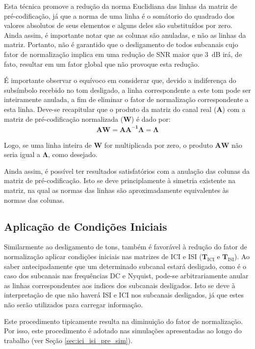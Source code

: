 Esta técnica promove a redução da norma Euclidiana das linhas da matriz de pré-codificação, já que a norma de uma linha é o somátorio do quadrado dos valores absolutos de seus elementos e alguns deles são substituídos por zero. Ainda assim, é importante notar que as colunas são anuladas, e não as linhas da matriz. Portanto, não é garantido que o desligamento de todos subcanais cujo fator de normalização implica em uma redução de SNR maior que $3$~dB irá, de fato, resultar em um fator global que não provoque esta redução. 

É importante observar o equívoco em considerar que, devido a indiferença do subsímbolo recebido no tom desligado, a linha correspondente a este tom pode ser inteiramente anulada, a fim de eliminar o fator de normalização correspondente a esta linha. Deve-se recapitular que o produto da matriz do canal real ($\mathbf{A}$) com a matriz de pré-codificação normalizada ($\mathbf{W}$) é dado por:
\begin{align}
\mathbf{AW} = \mathbf{A A^{-1}\Lambda} = \mathbf{\Lambda}
\end{align}

Logo, se uma linha inteira de $\mathbf{W}$ for multiplicada por zero, o produto $\mathbf{AW}$ não seria igual a $\mathbf{\Lambda}$, como desejado.

Ainda assim, é possível ter resultados satisfatórios com a anulação das colunas da matriz de pré-codificação. Isto se deve principlamente à simetria existente na matriz, na qual as normas das linhas são aproximadamente equivalentes às normas das colunas.

\subsection{Aplicação de Condições Iniciais}
\label{subsec:cond_iniciais}

Similarmente ao desligamento de tons, também é favorável à redução do fator de normalização aplicar condições iniciais nas matrizes de ICI e ISI ($\mathbf{T}_\text{ICI}$ e $\mathbf{T}_\text{ISI}$). Ao saber antecipadamente que um determinado subcanal estará desligado, como é o caso dos subcanais nas frequências DC e Nyquist, pode-se arbitrariamente anular as linhas correspondentes aos indices dos subcanais desligados. Isto se deve à interpretação de que não haverá ISI e ICI nos subcanais desligados, já que estes não serão utilizados para carregar informação.

Este procedimento tipicamente resulta na diminuição do fator de normalização. Por isso, este procedimento é adotado nas simulações apresentadas ao longo do trabalho (ver Seção \ref{sec:ici_isi_pre_sim}).

